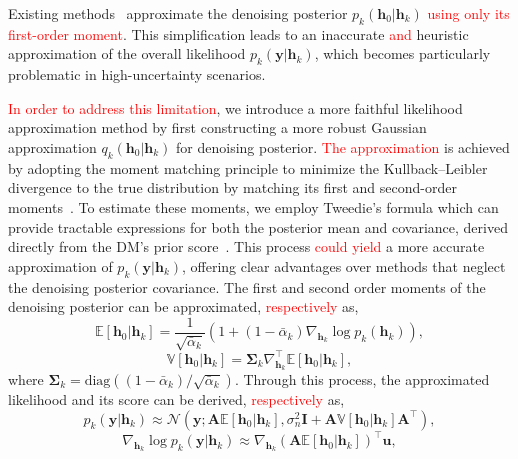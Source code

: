 \documentclass[lettersize,journal]{IEEEtran}
\newcommand{\tred}{\textcolor{red}}
\begin{document}
Existing methods~\cite{arvinteMIMOChannelEstimation2023,zhouGenerativeDiffusionModels2025} approximate the denoising posterior $p_{k}(\mathbf{h}_{0}|\mathbf{h}_{k})$ \tred{using only its first-order moment}. This simplification leads to an inaccurate \tred{and} heuristic approximation of the overall likelihood $p_{k}(\mathbf{y}|\mathbf{h}_{k})$, which becomes particularly problematic in high-uncertainty scenarios.

\tred{In order to address this limitation}, we introduce a more faithful likelihood approximation method by first constructing a more robust Gaussian approximation $q_{k}(\mathbf{h}_{0}|\mathbf{h}_{k})$ for denoising posterior. \tred{The approximation} is achieved by adopting the moment matching principle to minimize the Kullback–Leibler divergence to the true distribution by matching its first and second-order moments~\cite{bishopPatternRecognitionMachine2006}. To estimate these moments, we employ Tweedie's formula which can provide tractable expressions for both the posterior mean and covariance, derived directly from the DM's prior score~\cite{efronTweediesFormulaSelection2011}. This process \tred{could yield} a more accurate approximation of $p_{k}(\mathbf{y}|\mathbf{h}_{k})$, offering clear advantages over methods that neglect the denoising posterior covariance. The first and second order moments of the denoising posterior can be approximated, \tred{respectively} as,
\begin{equation}
\label{eq:first_moment}
\mathbb{E}[\mathbf{h}_{0}|\mathbf{h}_{k}] = \frac{1}{\sqrt{ \bar{\alpha}_{k} }}(1+(1-\bar{\alpha}_{k})\nabla_{\mathbf{h}_{k}}\log p_{k}(\mathbf{h}_{k})),
\end{equation}
\begin{equation}
\label{eq:second_moment}
\mathbb{V}[\mathbf{h}_{0}|\mathbf{h}_{k}] = \boldsymbol{\Sigma}_{k}\nabla_{\mathbf{h}_{k}}^{\top}\mathbb{E}[\mathbf{h}_{0}|\mathbf{h}_{k}],
\end{equation}
where $\boldsymbol{\Sigma}_{k} = \text{diag}((1-\bar{\alpha}_{k}) / \sqrt{ \bar{\alpha}_{k} })$. Through this process, the approximated likelihood and its score can be derived, \tred{respectively} as,
\begin{equation}
\label{eq:likelihood_approx}
p_{k}(\mathbf{y}|\mathbf{h}_{k}) \approx \mathcal{N}(\mathbf{y}; \mathbf{A}\mathbb{E}[\mathbf{h}_{0}|\mathbf{h}_{k}], \sigma_{n}^{2}\mathbf{I}+\mathbf{A}\mathbb{V}[\mathbf{h}_{0}|\mathbf{h}_{k}]\mathbf{A}^{\top}),
\end{equation}
\begin{equation}
\label{eq:likelihood_score_approx}
\nabla_{\mathbf{h}_{k}}\log p_{k}(\mathbf{y}|\mathbf{h}_{k}) \approx \nabla_{\mathbf{h}_{k}} (\mathbf{A}\mathbb{E}[\mathbf{h}_{0}|\mathbf{h}_{k}])^{\top}\mathbf{u},
\end{equation}
\end{document}
